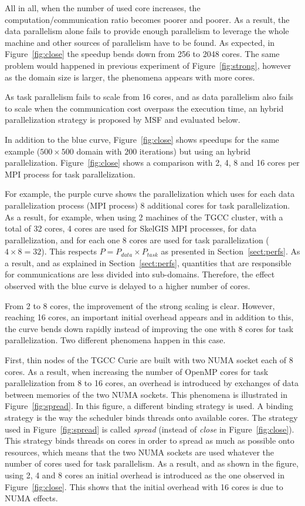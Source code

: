 All in all, when the number of used core increases, the computation/communication ratio becomes poorer and poorer. As a result, the data parallelism alone fails to provide enough parallelism to leverage the whole machine and other sources of parallelism have to be found. As expected, in  Figure~\ref{fig:close} the speedup bends down from 256 to 2048 cores. The same problem would happened in previous experiment of Figure~\ref{fig:strong}, however as the domain size is larger, the phenomena appears with more cores. 

As task parallelism fails to scale from 16 cores, and as data parallelism also fails to scale when the communication cost overpass the execution time, an hybrid parallelization strategy is proposed by MSF and evaluated below.

In addition to the blue curve, Figure~\ref{fig:close} shows speedups for the same example ($500 \times 500$ domain with $200$ iterations) but using an hybrid parallelization. Figure~\ref{fig:close} shows a comparison with 2, 4, 8 and 16 cores per MPI process for task parallelization.

For example, the purple curve shows the parallelization which uses for each data parallelization process (\ie MPI process) 8 additional cores for task parallelization. As a result, for example, when using 2 machines of the TGCC cluster, with a total of 32 cores, 4 cores are used for SkelGIS MPI processes, for data parallelization, and for each one 8 cores are used for task parallelization ($4 \times 8 = 32$). This respects $P = P_{data} \times P_{task}$ as presented in Section~\ref{sect:perfs}.
As a result, and as explained in Section~\ref{sect:perfs}, quantities that are responsible for communications are less divided into sub-domains. Therefore, the effect observed with the blue curve is delayed to a higher number of cores.

From 2 to 8 cores, the improvement of the strong scaling is clear. However, reaching 16 cores, an important initial overhead appears and in addition to this, the curve bends down rapidly instead of improving the one with 8 cores for task parallelization. Two different phenomena happen in this case.

First, thin nodes of the TGCC Curie are built with two NUMA socket each of 8 cores. As a result, when increasing the number of OpenMP cores for task parallelization from 8 to 16 cores, an overhead is introduced by exchanges of data between memories of the two NUMA sockets. This phenomena is illustrated in Figure~\ref{fig:spread}. In this figure, a different binding strategy is used. A binding strategy is the way the scheduler binds threads onto available cores. The strategy used in Figure~\ref{fig:spread} is called \emph{spread} (instead of \emph{close} in Figure~\ref{fig:close}). This strategy binds threads on cores in order to spread as much as possible onto resources, which means that the two NUMA sockets are used whatever the number of cores used for task parallelism. As a result, and as shown in the figure, using 2, 4 and 8 cores an initial overhead is introduced as the one observed in Figure~\ref{fig:close}. This shows that the initial overhead with 16 cores is due to NUMA effects.

